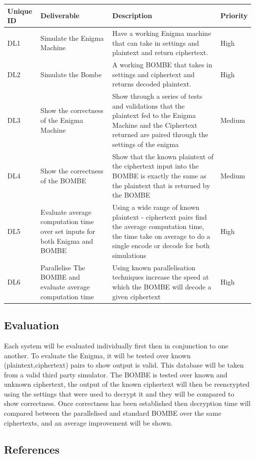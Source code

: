 \documentclass[12pt,a4paper]{article}
\begin{document}
\vspace*{6pt}
\label{units}
\begin{longtable}{ |p{1.25cm}|p{4cm}|p{5cm}|p{2cm}| }\hline\hline
Unique ID & Deliverable & Description & Priority \\ \hline
DL1 & Simulate the Enigma Machine & Have a working Enigma machine that can take in settings and plaintext and return ciphertext. & High \\ \hline
DL2 & Simulate the Bombe & A working BOMBE that takes in settings and ciphertext and returns decoded plaintext. & High \\ \hline
DL3 & Show the correctness of the Enigma Machine & Show through a series of tests and validations that the plaintext fed to the Enigma Machine and the Ciphertext returned are paired through the settings of the enigma & Medium \\ \hline
DL4 & Show the correctness of the BOMBE & Show that the known plaintext of the ciphertext input into the BOMBE is exactly the same as the plaintext that is returned by the BOMBE & Medium \\ \hline
DL5 & Evaluate average computation time over set inputs for both Enigma and BOMBE & Using a wide range of known plaintext - ciphertext pairs find the average computation time, the time take on average to do a single encode or decode for both simulations & High \\ \hline
DL6 & Parallelise The BOMBE and evaluate average computation time & Using known parallelisation techniques increase the speed at which the BOMBE will decode a given ciphertext & High \\ \hline
\end{longtable}

\subsection{Evaluation}

Each system will be evaluated individually first then in conjunction to one another. To evaluate the Enigma, it will be tested over known (plaintext,ciphertext) pairs to show output is valid. This database will be taken from a valid third party simulator. The BOMBE is tested over known and unknown ciphertext, the output of the known ciphertext will then be reencrypted using the settings that were used to decrypt it and they will be compared to show correctness. Once correctness has been established then decryption time will compared between the parallelised and standard BOMBE over the same ciphertexts, and an average improvement will be shown.

\subsection{References} 



\nocite{*}
\end{document}
